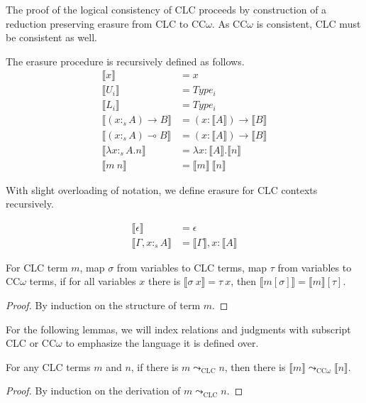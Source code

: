 \documentclass[sigplan,screen,review,anonymous]{acmart}
\newcommand{\stype}[1]{:_#1}
\newcommand{\step}{\leadsto}
\newcommand{\erase}[1]{\llbracket #1 \rrbracket}
\begin{document}
The proof of the logical consistency of CLC proceeds by construction of a reduction preserving erasure from CLC to CC$\omega$. As CC$\omega$ is consistent, CLC must be consistent as well.

The erasure procedure is recursively defined as follows.
\begin{align*}
  \erase{x}                             & = x                                     \\
  \erase{U_i}                           & = Type_i                                \\
  \erase{L_i}                           & = Type_i                                \\
  \erase{(x \stype{s} A) \rightarrow B} & = (x : \erase{A}) \rightarrow \erase{B} \\
  \erase{(x \stype{s} A) \multimap B}   & = (x : \erase{A}) \rightarrow \erase{B} \\
  \erase{\lambda x\stype{s}A.n}         & = \lambda x : \erase{A}.\erase{n}       \\
  \erase{m\ n}                          & = \erase{m}\ \erase{n}
\end{align*}

With slight overloading of notation, we define erasure for CLC contexts recursively.

\begin{align*}
  \erase{\epsilon}              & = \epsilon                      \\
  \erase{\Gamma, x \stype{s} A} & = \erase{\Gamma}, x : \erase{A}
\end{align*}

\begin{lemma}
  For CLC term $m$, map $\sigma$ from variables to CLC terms, map $\tau$ from variables to CC$\omega$ terms, if for all variables $x$ there is $\erase{\sigma\ x} = \tau\ x$, then $\erase{m[\sigma]} = \erase{m}[\tau]$.
\end{lemma}
\begin{proof}
  By induction on the structure of term $m$.
\end{proof}

For the following lemmas, we will index relations and judgments with subscript CLC or CC$\omega$ to emphasize the language it is defined over.

\begin{lemma}\label{erasestep}
  For any CLC terms $m$ and $n$, if there is $m \step_{\scriptscriptstyle \text{CLC}} n$, then there is $\erase{m} \step_{\scriptscriptstyle \text{CC$\omega$}} \erase{n}$.
\end{lemma}
\begin{proof}
  By induction on the derivation of $m \step_{\scriptscriptstyle \text{CLC}} n$.
\end{proof}
\end{document}
